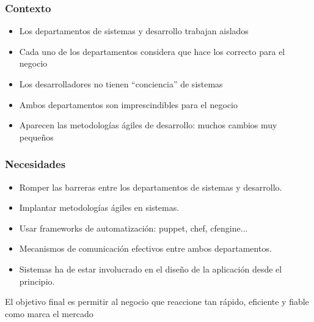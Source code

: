 \documentclass{beamer}
\begin{document}
\begin{frame}
  \frametitle{Contexto}
  \begin{itemize}
    \item Los departamentos de sistemas y desarrollo trabajan aislados
    \item Cada uno de los departamentos considera que hace los correcto para el negocio
    \item Los desarrolladores no tienen ``conciencia'' de sistemas
    \item Ambos departamentos son imprescindibles para el negocio
    \item Aparecen las metodologías ágiles de desarrollo: muchos cambios muy pequeños
  \end{itemize}
\end{frame}


\begin{frame}
  \frametitle{Necesidades}
  \begin{itemize}
    \item Romper las barreras entre los departamentos de sistemas y desarrollo.
    \item Implantar metodologías ágiles en sistemas.
    \item Usar frameworks de automatización: puppet, chef, cfengine...
    \item Mecanismos de comunicación efectivos entre ambos departamentos.
    \item Sistemas ha de estar involucrado en el diseño de la aplicación desde el principio.
  \end{itemize}

  \begin{center}
    \item El objetivo final es permitir al negocio que reaccione tan rápido, eficiente y fiable como marca el mercado
  \end{center}
\end{frame}
\end{document}
